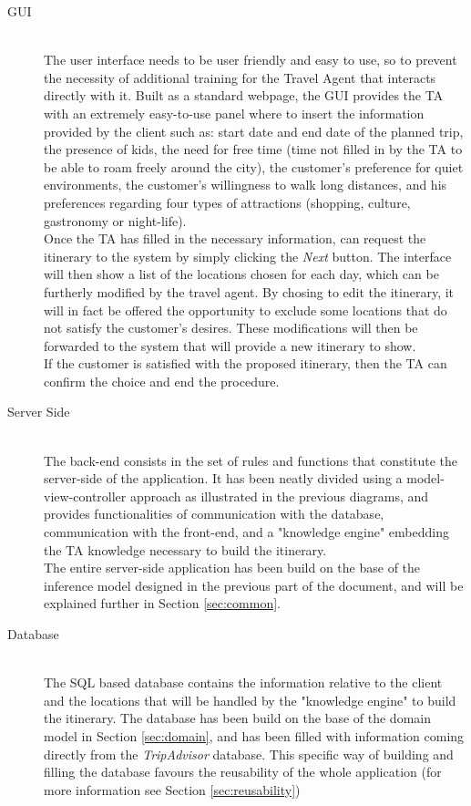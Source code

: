 \documentclass[11pt]{article} %
\begin{document}
\begin{description}
\item[GUI] \hfill \\
The user interface needs to be user friendly and easy to use, so to prevent the necessity of additional training for the Travel Agent that interacts directly with it. Built as a standard webpage, the GUI provides the TA with an extremely easy-to-use panel where to insert the information provided by the client such as: start date and end date of the planned trip, the presence of kids, the need for free time (time not filled in by the TA to be able to roam freely around the city), the customer's preference for quiet environments, the customer's willingness to walk long distances, and his preferences regarding four types of attractions (shopping, culture, gastronomy or night-life).\\
Once the TA has filled in the necessary information, can request the itinerary to the system by simply clicking the \textit{Next} button. The interface will then show a list of the locations chosen for each day, which can be furtherly modified by the travel agent. By chosing to edit the itinerary, it will in fact be offered the opportunity to exclude some locations that do not satisfy the customer's desires. These modifications will then be forwarded to the system that will provide a new itinerary to show.\\
If the customer is satisfied with the proposed itinerary, then the TA can confirm the choice and end the procedure.
\item[Server Side] \hfill \\
The back-end consists in the set of rules and functions that constitute the server-side of the application. It has been neatly divided using a model-view-controller approach as illustrated in the previous diagrams, and provides functionalities of communication with the database, communication with the front-end, and a "knowledge engine" embedding the TA knowledge necessary to build the itinerary.\\
The entire server-side application has been build on the base of the inference model designed in the previous part of the document, and will be explained further in Section \ref{sec:common}.
\item[Database] \hfill \\
The SQL based database contains the information relative to the client and the locations that will be handled by the "knowledge engine" to build the itinerary. The database has been build on the base of the domain model in Section \ref{sec:domain}, and has been filled with information coming directly from the \textit{TripAdvisor} database. This specific way of building and filling the database favours the reusability of the whole application (for more information see Section \ref{sec:reusability})
\end{description}
\end{document}
